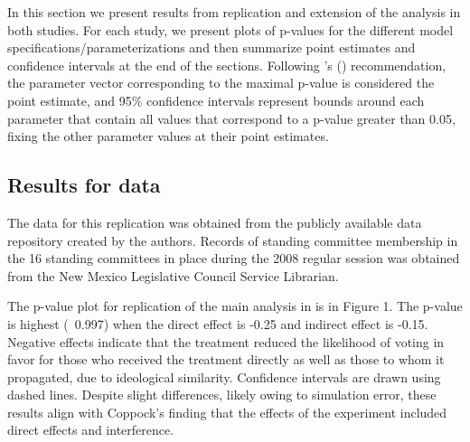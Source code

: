 \documentclass[12pt]{article}
\def\citeapos#1{\citeauthor{#1}'s (\citeyear{#1})}
\begin{document}
In this section we present results from replication and extension of the analysis in both studies. For each study, we present plots of p-values for the different model specifications/parameterizations and then summarize point estimates and confidence intervals at the end of the sections. Following \citeapos{bowers2012reasoning} recommendation, the parameter vector corresponding to the maximal p-value is considered the point estimate, and 95\% confidence intervals represent bounds around each parameter that contain all values that correspond to a p-value greater than 0.05, fixing the other parameter values at their point estimates.


\subsection{Results for \citet{butler2011can} data}

The data for this replication was obtained from the publicly available data repository created by the authors. Records of standing committee membership in the 16 standing committees in place during the 2008 regular session was obtained from the New Mexico Legislative Council Service Librarian.

The p-value plot for replication of the main analysis in \citet{coppock2014information} is in Figure 1. The p-value is highest (~0.997) when the direct effect is -0.25 and indirect effect is -0.15. Negative effects indicate that the treatment reduced the likelihood of voting in favor for those who received the treatment directly as well as those to whom it propagated, due to ideological similarity. Confidence intervals are drawn using dashed lines. Despite slight differences, likely owing to simulation error, these results align with Coppock's finding that the effects of the experiment included direct effects and interference.
\end{document}
